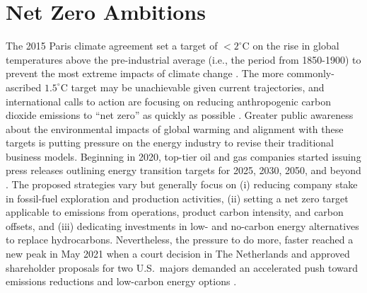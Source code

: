 \section{Net Zero Ambitions}\label{ch1:netzero}
The 2015 Paris climate agreement set a target of $<2^\circ$C on the rise in global temperatures above the pre-industrial average (i.e., the period from 1850-1900) to prevent the most extreme impacts of climate change \citep{unfccc_paris_2015}. The more commonly-ascribed $1.5^\circ$C target may be unachievable given current trajectories, and international calls to action are focusing on reducing anthropogenic carbon dioxide emissions to ``net zero'' as quickly as possible \citep{ipcc_global_2018}. Greater public awareness about the environmental impacts of global warming and alignment with these targets is putting pressure on the energy industry to revise their traditional business models. Beginning in 2020, top-tier oil and gas companies started issuing press releases outlining energy transition targets for 2025, 2030, 2050, and beyond \citep{bp_international_2020,chevron_chevron_2021,conocophillips_conocophillips_2020,equinor_equinor_2020,exxonmobil_exxonmobil_2021,shell_responsible_2020,shell_shell_2021,total_total_2020,total_2020_2021}. The proposed strategies vary but generally focus on (i) reducing company stake in fossil-fuel exploration and production activities, (ii) setting a net zero target applicable to emissions from operations, product carbon intensity, and carbon offsets, and (iii) dedicating investments in low- and no-carbon energy alternatives to replace hydrocarbons. Nevertheless, the pressure to do more, faster reached a new peak in May 2021 when a court decision in The Netherlands and approved shareholder proposals for two U.S.\ majors demanded an accelerated push toward emissions reductions and low-carbon energy options \citep{mcwilliams_investors_2021}.

